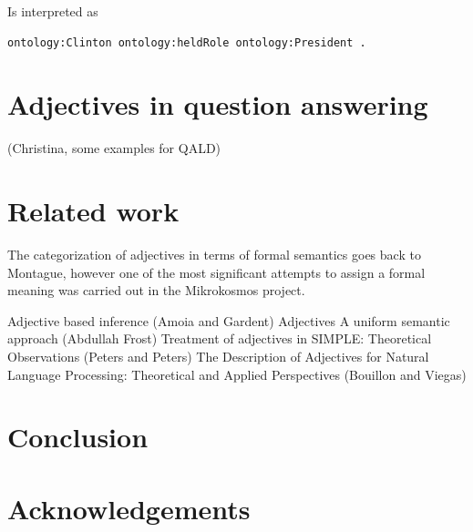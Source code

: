 \documentclass[11pt]{article}
\begin{document}
Is interpreted as

\begin{verbatim}
ontology:Clinton ontology:heldRole ontology:President .
\end{verbatim}

\section{Adjectives in question answering}

(Christina, some examples for QALD)

\section{Related work}

The categorization of adjectives in terms of formal semantics goes back to Montague, however one of the most significant attempts to assign a formal meaning was carried out in the Mikrokosmos project\cite{raskin1995lexical}. 


Adjective based inference (Amoia and Gardent)
Adjectives A uniform semantic approach (Abdullah Frost)
Treatment of adjectives in SIMPLE: Theoretical Observations (Peters and Peters)
The Description of Adjectives for Natural Language Processing: Theoretical and Applied Perspectives (Bouillon and Viegas)


\section{Conclusion}

\section*{Acknowledgements}



\end{document}
